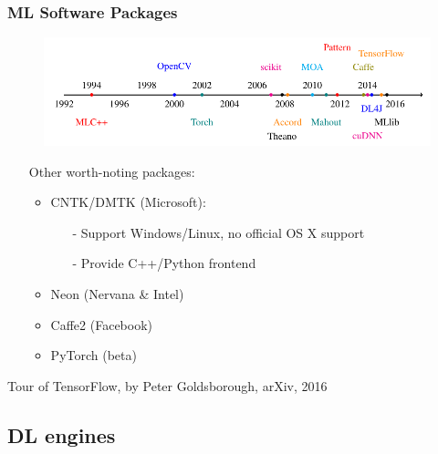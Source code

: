 \begin{frame}
  \MyLogo
  \frametitle{ML Software Packages}  

\begin{figure}[htbp] %
   \centering
   \includegraphics[width=1.0\linewidth]{figures/ML.pdf} 
\end{figure}

\begin{itemize}
\item[\raisebox{-0.4ex}{\alert{\HandRight}}] Other worth-noting packages: 
	\begin{itemize}
	\item CNTK/DMTK (Microsoft): 
		\begin{itemize}
		\item[-] Support Windows/Linux, no official OS X support
		\item[-] Provide C++/Python frontend
		\end{itemize}
	\item Neon (Nervana \& Intel)
	\item Caffe2 (Facebook)
	\item PyTorch (\alert{beta})
	\end{itemize}
\end{itemize}

\vfill
\begin{center}
{\color{red} \scriptsize
Tour of TensorFlow, by Peter Goldsborough, arXiv, 2016}
\end{center}

\end{frame}

\subsection{DL engines}


